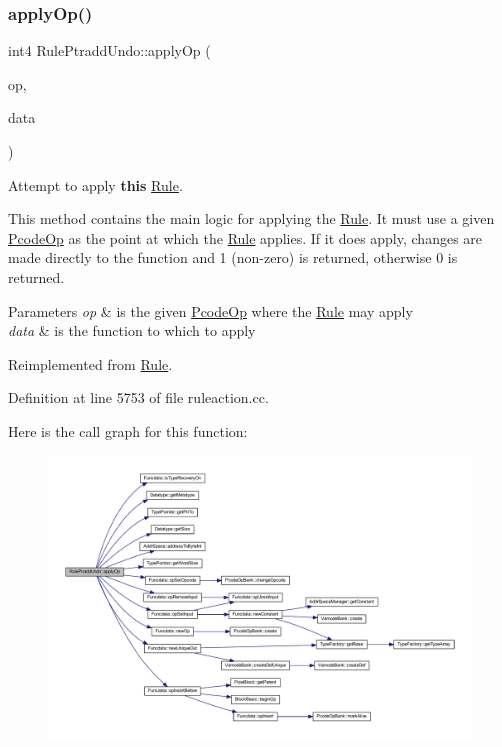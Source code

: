 \subsubsection{\texorpdfstring{applyOp()}{applyOp()}}
{\footnotesize\ttfamily int4 Rule\+Ptradd\+Undo\+::apply\+Op (\begin{DoxyParamCaption}\item[{\mbox{\hyperlink{class_pcode_op}{Pcode\+Op}} $\ast$}]{op,  }\item[{\mbox{\hyperlink{class_funcdata}{Funcdata}} \&}]{data }\end{DoxyParamCaption})\hspace{0.3cm}{\ttfamily [virtual]}}



Attempt to apply {\bfseries{this}} \mbox{\hyperlink{class_rule}{Rule}}. 

This method contains the main logic for applying the \mbox{\hyperlink{class_rule}{Rule}}. It must use a given \mbox{\hyperlink{class_pcode_op}{Pcode\+Op}} as the point at which the \mbox{\hyperlink{class_rule}{Rule}} applies. If it does apply, changes are made directly to the function and 1 (non-\/zero) is returned, otherwise 0 is returned. 
\begin{DoxyParams}{Parameters}
{\em op} & is the given \mbox{\hyperlink{class_pcode_op}{Pcode\+Op}} where the \mbox{\hyperlink{class_rule}{Rule}} may apply \\
\hline
{\em data} & is the function to which to apply \\
\hline
\end{DoxyParams}


Reimplemented from \mbox{\hyperlink{class_rule_a4e3e61f066670175009f60fb9dc60848}{Rule}}.



Definition at line 5753 of file ruleaction.\+cc.

Here is the call graph for this function\+:
\nopagebreak
\begin{figure}[H]
\begin{center}
\leavevmode
\includegraphics[width=350pt]{class_rule_ptradd_undo_afc408fd7b407b90b30b2d039e6a1ed14_cgraph}
\end{center}
\end{figure}
\mbox{\label{class_rule_ptradd_undo_a1838c48328cbd127036ec498a66d8989}} 
